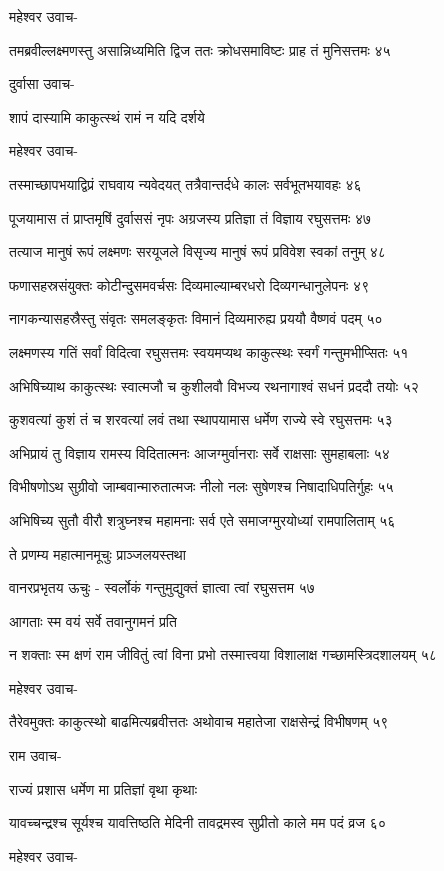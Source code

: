 महेश्वर उवाच-

तमब्रवील्लक्ष्मणस्तु असान्निध्यमिति द्विज
ततः क्रोधसमाविष्टः प्राह तं मुनिसत्तमः ४५

दुर्वासा उवाच-

शापं दास्यामि काकुत्स्थं रामं न यदि दर्शये

महेश्वर उवाच-

तस्माच्छापभयाद्विप्रं राघवाय न्यवेदयत्
तत्रैवान्तर्दधे कालः सर्वभूतभयावहः ४६

पूजयामास तं प्राप्तमृषिं दुर्वाससं नृपः
अग्रजस्य प्रतिज्ञा तं विज्ञाय रघुसत्तमः ४७

तत्याज मानुषं रूपं लक्ष्मणः सरयूजले
विसृज्य मानुषं रूपं प्रविवेश स्वकां तनुम् ४८

फणासहस्रसंयुक्तः कोटीन्दुसमवर्चसः
दिव्यमाल्याम्बरधरो दिव्यगन्धानुलेपनः ४९

नागकन्यासहस्रैस्तु संवृतः समलङ्कृतः
विमानं दिव्यमारुह्य प्रययौ वैष्णवं पदम् ५०

लक्ष्मणस्य गतिं सर्वां विदित्वा रघुसत्तमः
स्वयमप्यथ काकुत्स्थः स्वर्गं गन्तुमभीप्सितः ५१

अभिषिच्याथ काकुत्स्थः स्वात्मजौ च कुशीलवौ
विभज्य रथनागाश्वं सधनं प्रददौ तयोः ५२

कुशवत्यां कुशं तं च शरवत्यां लवं तथा
स्थापयामास धर्मेण राज्ये स्वे रघुसत्तमः ५३

अभिप्रायं तु विज्ञाय रामस्य विदितात्मनः
आजग्मुर्वानराः सर्वे राक्षसाः सुमहाबलाः ५४

विभीषणोऽथ सुग्रीवो जाम्बवान्मारुतात्मजः
नीलो नलः सुषेणश्च निषादाधिपतिर्गुहः ५५

अभिषिच्य सुतौ वीरौ शत्रुघ्नश्च महामनाः
सर्व एते समाजग्मुरयोध्यां रामपालिताम् ५६

ते प्रणम्य महात्मानमूचुः प्राञ्जलयस्तथा

वानरप्रभृतय ऊचुः -
स्वर्लोकं गन्तुमुद्युक्तं ज्ञात्वा त्वां रघुसत्तम ५७

आगताः स्म वयं सर्वे तवानुगमनं प्रति

न शक्ताः स्म क्षणं राम जीवितुं त्वां विना प्रभो
तस्मात्त्वया विशालाक्ष गच्छामस्त्रिदशालयम् ५८

महेश्वर उवाच-

तैरेवमुक्तः काकुत्स्थो बाढमित्यब्रवीत्ततः
अथोवाच महातेजा राक्षसेन्द्रं विभीषणम् ५९

राम उवाच-

राज्यं प्रशास धर्मेण मा प्रतिज्ञां वृथा कृथाः

यावच्चन्द्रश्च सूर्यश्च यावत्तिष्ठति मेदिनी
तावद्रमस्व सुप्रीतो काले मम पदं व्रज ६०

महेश्वर उवाच-

